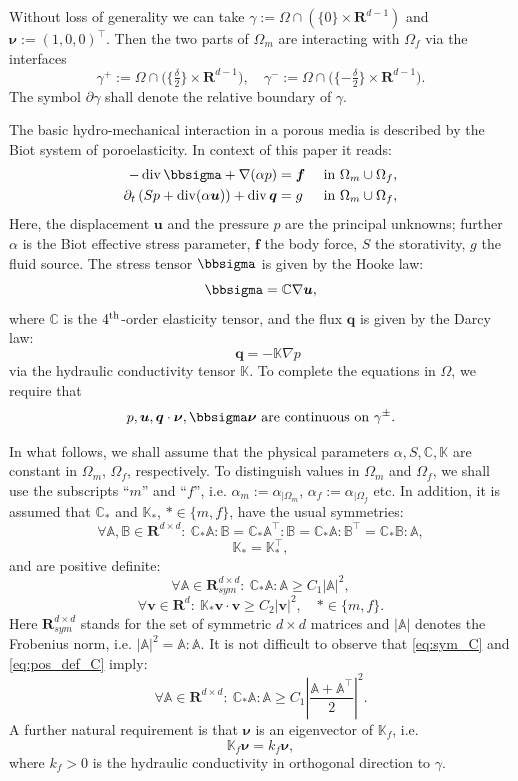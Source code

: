 \documentclass[a4paper]{article}
\def\div{\operatorname{div}}
\def\dt{\prtl_t}
\def\ff{\vc f}
\def\nnu{\vc\nu}
\def\prtl{\partial}
\def\qq{\vc q}
\def\Real{{\mathbf R}}
\def\tn#1{{\mathbb{#1}}}    %
\def\uu{\vc u}
\def\vc#1{\mathbf{\boldsymbol{#1}}}     %
\def\vv{\vc v}
\newcommand{\eq}[1]{\begin{equation}#1\end{equation}}
\begin{document}
Without loss of generality we can take $\gamma:=\Omega\cap\left(\{0\}\times\Real^{d-1}\right)$ and $\nnu:=(1,0,0)^\top$.
Then the two parts of $\Omega_m$ are interacting with $\Omega_f$ via the interfaces
\eq{ \gamma^+:=\Omega\cap\big( \{\tfrac\delta2\}\times \Real^{d-1}\big), \quad \gamma^-:=\Omega\cap\big( \{ -\tfrac\delta2\}\times \Real^{d-1}\big). }
The symbol $\prtl\gamma$ shall denote the relative boundary of $\gamma$.

The basic hydro-mechanical interaction in a porous media is described by the Biot system of poroelasticity.
In context of this paper it reads:
\begin{subequations}
\label{eq:biot}
\begin{align}
    \label{eq:lin_el}
    -\div \bbsigma + \nabla(\alpha p) &= \ff &&\mbox{ in }\Omega_m\cup\Omega_f,\\
\label{eq:biot_darcy}    \dt\left(Sp + \div(\alpha\uu)\right) + \div\qq &= g &&\mbox{ in }\Omega_m\cup\Omega_f,
\end{align}
\end{subequations}
Here, the displacement $\uu$ and the pressure $p$ are the principal unknowns; further $\alpha$ is the Biot effective stress parameter, $\ff$ the body force, $S$ the storativity, $g$ the fluid source.
The stress tensor $\bbsigma$ is given by the Hooke law:
\eq{ \bbsigma = \tn C\nabla\uu, }
where $\tn C$ is the $4^{\rm th}$-order elasticity tensor, and the flux $\qq$ is given by the Darcy law:
\eq{ \quad \qq = -\tn K\nabla p }
via the hydraulic conductivity tensor $\tn K$.
To complete the equations in $\Omega$, we require that
\eq{ \label{eq:continuity_on_gamma_pm} p,\uu,\qq\cdot\nnu,\bbsigma\nnu \mbox{ are continuous on } \gamma^\pm. }

In what follows, we shall assume that the physical parameters $\alpha,S,\tn C,\tn K$ are constant in $\Omega_m$, $\Omega_f$, respectively.
To distinguish values in $\Omega_m$ and $\Omega_f$, we shall use the subscripts ``$m$'' and ``$f$'', i.e. $\alpha_m := \alpha_{|\Omega_m}$, $\alpha_f := \alpha_{|\Omega_f}$ etc.
In addition, it is assumed that $\tn C_*$ and $\tn K_*$, $*\in\{m,f\}$, have the usual symmetries:
\eq{ \label{eq:sym_C} \forall \tn A,\tn B\in\Real^{d\times d}:~ \tn C_*\tn A:\tn B=\tn C_*\tn A^\top:\tn B=\tn C_*\tn A:\tn B^\top=\tn C_*\tn B:\tn A, }
\eq{ \tn K_* = \tn K_*^\top, }
and are positive definite:
\eq{ \label{eq:pos_def_C} \forall\tn A\in\Real^{d\times d}_{sym}:~\tn C_*\tn A:\tn A \ge C_1|\tn A|^2, }
\eq{ \forall\vv\in\Real^d:~\tn K_*\vv\cdot\vv \ge C_2|\vv|^2,\quad *\in\{m,f\}. }
Here $\Real^{d\times d}_{sym}$ stands for the set of symmetric $d\times d$ matrices and $|\tn A|$ denotes the Frobenius norm, i.e. $|\tn A|^2=\tn A:\tn A$.
It is not difficult to observe that \eqref{eq:sym_C} and \eqref{eq:pos_def_C} imply:
\eq{ \label{eq:pos_def_C_gen} \forall\tn A\in\Real^{d\times d}:~\tn C_*\tn A:\tn A \ge C_1\left|\frac{\tn A+\tn A^\top}2\right|^2. }
A further natural requirement is that $\nnu$ is an eigenvector of $\tn K_f$, i.e.
\eq{\label{eq:normal_conductivity} \tn K_f\nnu = k_f\nnu, }
where $k_f>0$ is the hydraulic conductivity in orthogonal direction to $\gamma$.
\end{document}
